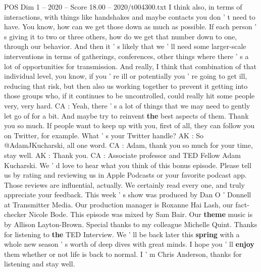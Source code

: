 \begin{textsample}{POS Dim 1 – 2020 – Score 18.00 – 2020/t004300.txt}
I think also, in terms of interactions, with things like handshakes and maybe contacts you don ' t need to have.
You know, how can we get those down as much as possible.
If each person ' s giving it to two or three others, how do we get that number down to one, through our behavior.
And then it ' s likely that we ' ll need some larger-scale interventions in terms of gatherings, conferences, other things where there ' s a lot of opportunities for transmission.
And really, I think that combination of that individual level, you know, if you ' re ill or potentially you ' re going to get ill, reducing that risk, but then also us working together to prevent it getting into those groups who, if it continues to be uncontrolled, could really hit some people very, very hard.
CA : Yeah, there ' s a lot of things that we may need to gently let go of for a bit.
And maybe try to reinvent \textbf{the} best aspects of them.
Thank you so much.
If people want to keep up with you, first of all, they can follow you on Twitter, for example.
What ' s your Twitter handle?
AK : So @AdamJKucharski, all one word.
CA : Adam, thank you so much for your time, stay well.
AK : Thank you.
CA : Associate professor and TED Fellow Adam Kucharski.
We ' d love to hear what you think of this bonus episode.
Please tell us by rating and reviewing us in Apple Podcasts or your favorite podcast app.
Those reviews are influential, actually.
We certainly read every one, and truly appreciate your feedback.
This week ' s show was produced by Dan O ' Donnell at Transmitter Media.
Our production manager is Roxanne Hai Lash, our fact-checker Nicole Bode.
This episode was mixed by Sam Bair.
Our \textbf{theme} music is by Allison Layton-Brown.
Special thanks to my colleague Michelle Quint.
Thanks for listening to \textbf{the} TED Interview.
We ' ll be back later this \textbf{spring} with a whole new season ' s worth of deep dives with great minds.
I hope you ' ll \textbf{enjoy} them whether or not life is back to normal.
I ' m Chris Anderson, thanks for listening and stay well.

\end{textsample}
